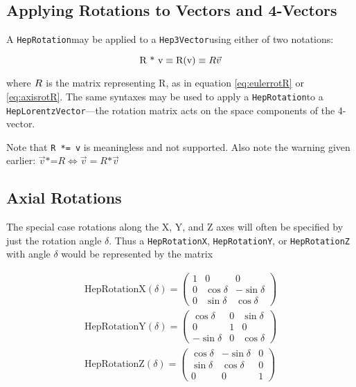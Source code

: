 \documentclass[twoside,12pt]{article}
\def \SV {{\tt Hep3Vector}}
\def \Ro {{\tt HepRotation}}
\def \LV {{\tt HepLorentzVector}}
\begin{document}
\subsection{Applying Rotations to Vectors and 4-Vectors}

A \Ro may be applied to a \SV using either of two notations:  

\begin{equation}
\label{eq:Rv}
\mbox{R * v} \equiv \mbox{R(v)} \equiv {\boldmath R} \vec{v}
\end{equation}

\noindent
where ${\boldmath R}$ is the matrix representing R, as in equation
\ref{eq:eulerrotR} or \ref{eq:axisrotR}.  The same syntaxes may be
used to apply a \Ro to a \LV ---the rotation matrix acts on the space
components of the 4-vector.

Note that {\tt R *= v} is meaningless and not supported.  
Also note the warning given earlier:
$ \vec{v} \mbox{*=} R \Longleftrightarrow \vec{v} = R \mbox{*} \vec{v} $

\subsection{Axial Rotations}

The special case rotations along the X, Y, and Z axes will often be specified
by just the rotation angle $\delta$.  Thus a 
{\tt HepRotationX}, {\tt HepRotationY}, or {\tt HepRotationZ}
with angle $\delta$ would be represented by the matrix

\begin{eqnarray}
  \label{eq:rotx}
  \mbox{HepRotationX}(\delta) =
\left(
\begin{array}{ccc}
 1 & 0 & 0 \\
 0 & \cos \delta & - \sin \delta \\
 0 & \sin \delta & \cos \delta 
\end{array}
\right) \\
  \label{eq:roty}
  \mbox{HepRotationY}(\delta) =
\left(
\begin{array}{ccc}
 \cos \delta & 0 & \sin \delta \\
 0 & 1 & 0 \\
 - \sin \delta & 0 & \cos \delta 
\end{array}
\right) \\
  \label{eq:rotz}
  \mbox{HepRotationZ}(\delta) =
\left(
\begin{array}{ccc}
 \cos \delta & - \sin \delta & 0 \\
 \sin \delta & \cos \delta & 0 \\
 0 & 0 & 1
\end{array}
\right) \\
\end{eqnarray}
\end{document}
